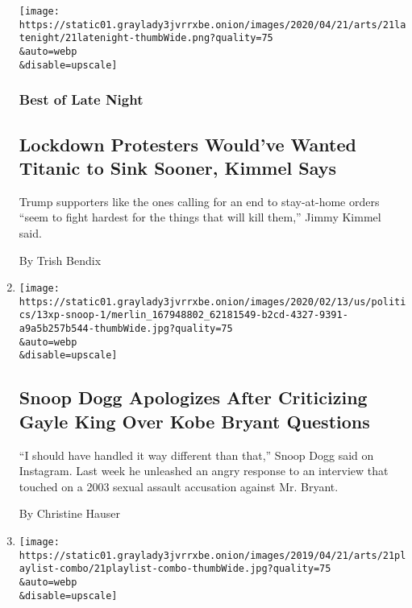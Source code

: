 \begin{enumerate}
  \texttt{[image: https://static01.graylady3jvrrxbe.onion/images/2020/04/21/arts/21latenight/21latenight-thumbWide.png?quality=75\\\&auto=webp\\\&disable=upscale]}

  \hypertarget{best-of-late-night}{%
  \subsubsection{Best of Late Night}\label{best-of-late-night}}

  \hypertarget{lockdown-protesters-wouldve-wanted-titanic-to-sink-sooner-kimmel-says}{%
  \subsection{Lockdown Protesters Would've Wanted Titanic to Sink
  Sooner, Kimmel
  Says}\label{lockdown-protesters-wouldve-wanted-titanic-to-sink-sooner-kimmel-says}}

  Trump supporters like the ones calling for an end to stay-at-home
  orders ``seem to fight hardest for the things that will kill them,''
  Jimmy Kimmel said.

  By Trish Bendix
\item
  \href{/2020/02/13/business/media/snoop-dogg-apologizes-gayle-king.html}{}

  \texttt{[image: https://static01.graylady3jvrrxbe.onion/images/2020/02/13/us/politics/13xp-snoop-1/merlin\_167948802\_62181549-b2cd-4327-9391-a9a5b257b544-thumbWide.jpg?quality=75\\\&auto=webp\\\&disable=upscale]}

  \hypertarget{snoop-dogg-apologizes-after-criticizing-gayle-king-over-kobe-bryant-questions}{%
  \subsection{Snoop Dogg Apologizes After Criticizing Gayle King Over
  Kobe Bryant
  Questions}\label{snoop-dogg-apologizes-after-criticizing-gayle-king-over-kobe-bryant-questions}}

  ``I should have handled it way different than that,'' Snoop Dogg said
  on Instagram. Last week he unleashed an angry response to an interview
  that touched on a 2003 sexual assault accusation against Mr. Bryant.

  By Christine Hauser
\item
  \href{/2019/04/17/arts/music/country-rap-playlist.html}{}

  \texttt{[image: https://static01.graylady3jvrrxbe.onion/images/2019/04/21/arts/21playlist-combo/21playlist-combo-thumbWide.jpg?quality=75\\\&auto=webp\\\&disable=upscale]}


\end{enumerate}
